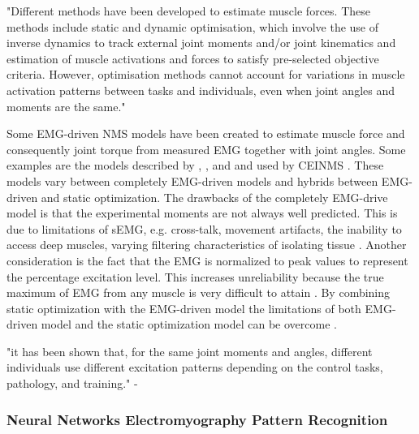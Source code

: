 "Different methods have been developed to estimate muscle forces. These methods include static and dynamic optimisation, which involve the use of inverse dynamics to track external joint moments and/or joint kinematics and estimation of muscle activations and forces to satisfy pre-selected objective criteria. However, optimisation methods cannot account for variations in muscle activation patterns  between tasks and individuals, even when joint angles and moments are the same." \cite{Pizzolato2015}

Some EMG-driven NMS models have been created to estimate muscle force and consequently joint torque from measured EMG together with joint angles. 
Some examples are the models described by , , and  and used by CEINMS \cite{Pizzolato2015}. 
These models vary between completely EMG-driven models and hybrids between EMG-driven and static optimization.
The drawbacks of the completely EMG-drive model is that the experimental moments are not always well predicted.
This is due to limitations of sEMG, e.g. cross-talk, movement artifacts, the inability to access deep muscles, varying filtering characteristics of isolating tissue \cite{Lloyd2003, Sartori2014}.
Another consideration is the fact that the EMG is normalized to peak values to represent the percentage excitation level. 
This increases unreliability because the true maximum of EMG from any muscle is very difficult to attain \cite{Sartori2014}.
By combining static optimization with the EMG-driven model the limitations of both EMG-driven model and the static optimization model can be overcome \cite{Sartori2014}.

"it has been shown that, for the same joint moments and angles, different
individuals use different excitation patterns depending on the control
tasks, pathology, and training." - \cite[p. 3614]{Sartori2014}

\subsubsection{Neural Networks Electromyography Pattern Recognition}

